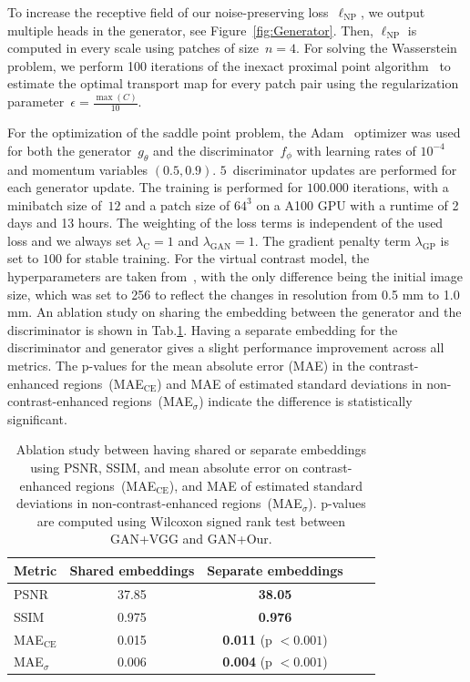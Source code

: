 \documentclass[a4paper,10pt]{article}
\begin{document}
To increase the receptive field of our noise-preserving loss~$\ell_\mathrm{NP}$, we output multiple heads in the generator, see Figure~\ref{fig:Generator}.
Then, $\ell_\mathrm{NP}$ is computed in every scale using patches of size~$n=4$.
For solving the Wasserstein problem, we perform 100 iterations of the inexact proximal point algorithm~\cite{XiXi20} to estimate the optimal transport map for every patch pair using the regularization parameter~$\epsilon=\tfrac {\max(C)} {10}$.

For the optimization of the saddle point problem, the Adam~\cite{KiBa15} optimizer was used for both the generator~$g_\theta$ and the discriminator~$f_\phi$ with learning rates of $10^{-4}$ and momentum variables $(0.5, 0.9)$.
$5$~discriminator updates are performed for each generator update.
The training is performed for $100.000$ iterations, with a minibatch size of~$12$ and a patch size of $64^3$ on a A100 GPU with a runtime of 2 days and 13 hours.
The weighting of the loss terms is independent of the used loss and we always set $\lambda_\mathrm{C} = 1$ and $\lambda_\mathrm{GAN} = 1$. 
The gradient penalty term $\lambda_\mathrm{GP}$ is set to $100$ for stable training.
For the virtual contrast model, the hyperparameters are taken from~\cite{PaJo21}, with the only difference being the initial image size, which was set to 256 to reflect the changes in resolution from 0.5 mm to 1.0 mm.
An ablation study on sharing the embedding between the generator and the discriminator is shown in Tab.\ref{tab:ablation}.
Having a separate embedding for the discriminator and generator gives a slight performance improvement across all metrics.
The p-values for the mean absolute error (MAE) in the contrast-enhanced regions~(MAE$_\mathrm{CE}$) and MAE of estimated standard deviations in non-contrast-enhanced regions~(MAE$_\sigma$) indicate the difference is statistically significant.

\begin{table}[t]
\centering
\caption{Ablation study between having shared or separate embeddings using PSNR, SSIM, and mean absolute error on contrast-enhanced regions~(MAE$_\mathrm{CE}$), and MAE of estimated standard deviations in non-contrast-enhanced regions~(MAE$_\sigma$). p-values are computed using Wilcoxon signed rank test between GAN+VGG and GAN+Our.}%
\label{tab:ablation}%
\begin{tabular}{l|cccc}
Metric & Shared embeddings  & Separate embeddings \\ \hline
PSNR &  37.85 & \textbf{38.05} \\
SSIM & {0.975} & \textbf{0.976} \\
MAE$_\mathrm{CE}$ & {0.015} & \textbf{0.011} (p $< 0.001$) \\
MAE$_\sigma$ & {0.006} & \textbf{0.004} (p $< 0.001$)\\
\end{tabular}
\end{table}
\end{document}
